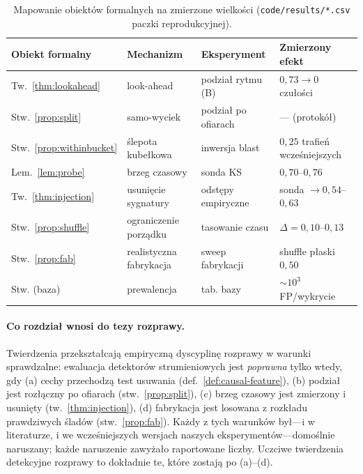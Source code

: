\documentclass[11pt]{article}
\begin{document}
\begin{table}[h]\centering\small
\begin{tabular}{llll}
\toprule
Obiekt formalny & Mechanizm & Eksperyment & Zmierzony efekt \\
\midrule
Tw.~\ref{thm:lookahead} & look-ahead & podział rytmu (B) & $0{,}73\to0$ czułości \\
Stw.~\ref{prop:split} & samo-wyciek & podział po ofiarach & --- (protokół) \\
Stw.~\ref{prop:withinbucket} & ślepota kubełkowa & inwersja blast & $0{,}25$ trafień wcześniejszych \\
Lem.~\ref{lem:probe} & brzeg czasowy & sonda KS & $0{,}70$--$0{,}76$ \\
Tw.~\ref{thm:injection} & usunięcie sygnatury & odstępy empiryczne & sonda $\to0{,}54$--$0{,}63$ \\
Stw.~\ref{prop:shuffle} & ograniczenie porządku & tasowanie czasu & $\Delta=0{,}10$--$0{,}13$ \\
Stw.~\ref{prop:fab} & realistyczna fabrykacja & sweep fabrykacji & shuffle płaski $0{,}50$ \\
Stw. (baza) & prewalencja & tab. bazy & $\sim10^3$ FP/wykrycie \\
\bottomrule
\end{tabular}
\caption{Mapowanie obiektów formalnych na zmierzone wielkości
(\texttt{code/results/*.csv} paczki reprodukcyjnej).}
\label{tab:mapping}
\end{table}

\paragraph{Co rozdział wnosi do tezy rozprawy.}
Twierdzenia przekształcają empiryczną dyscyplinę rozprawy w warunki
sprawdzalne: ewaluacja detektorów strumieniowych jest \emph{poprawna}
tylko wtedy, gdy (a) cechy przechodzą test usuwania
(def.~\ref{def:causal-feature}), (b) podział jest rozłączny po ofiarach
(stw.~\ref{prop:split}), (c) brzeg czasowy jest zmierzony i usunięty
(tw.~\ref{thm:injection}), (d) fabrykacja jest losowana z rozkładu
prawdziwych śladów (stw.~\ref{prop:fab}). Każdy z tych warunków był---i w
literaturze, i we wcześniejszych wersjach naszych eksperymentów---domoślnie
naruszany; każde naruszenie zawyżało raportowane liczby. Uczciwe
twierdzenia detekcyjne rozprawy to dokładnie te, które zostają po
(a)--(d).
\end{document}
